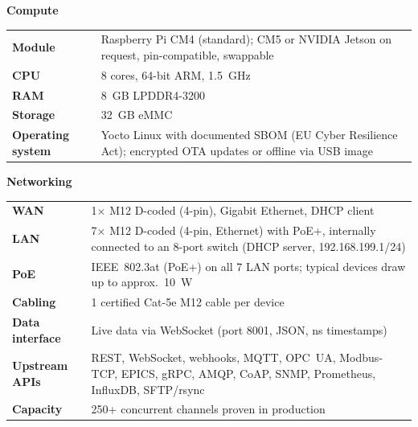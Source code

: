 \documentclass[10pt,a4paper]{article}
\begin{document}
\vspace{2mm}
\begin{minipage}[t]{0.48\textwidth}
\textbf{Compute}\par\vspace{1mm}
\begin{tabularx}{\textwidth}{@{}>{\bfseries}p{2.9cm}X@{}}
\toprule
Module & Raspberry Pi CM4 (standard); CM5 or NVIDIA Jetson on request, pin-compatible, swappable \\
CPU & 8 cores, 64-bit ARM, \SI{1.5}{GHz} \\
RAM & \SI{8}{GB} LPDDR4-3200 \\
Storage & \SI{32}{GB} eMMC \\
Operating system & Yocto Linux with documented SBOM (EU Cyber Resilience Act); encrypted OTA updates or offline via USB image \\
\bottomrule
\end{tabularx}

\vspace{2mm}
\textbf{Networking}\par\vspace{1mm}
\begin{tabularx}{\textwidth}{@{}>{\bfseries}p{2.9cm}X@{}}
\toprule
WAN & 1$\times$ M12 D-coded (4-pin), Gigabit Ethernet, DHCP client \\
LAN & 7$\times$ M12 D-coded (4-pin, Ethernet) with PoE+, internally connected to an 8-port switch (DHCP server, 192.168.199.1/24) \\
PoE & IEEE~802.3at (PoE+) on all 7 LAN ports; typical devices draw up to approx.\ \SI{10}{W} \\
Cabling & 1 certified Cat-5e M12 cable per device \\
Data interface & Live data via WebSocket (port 8001, JSON, ns timestamps) \\
Upstream APIs & REST, WebSocket, webhooks, MQTT, OPC~UA, Modbus-TCP, EPICS, gRPC, AMQP, CoAP, SNMP, Prometheus, InfluxDB, SFTP/rsync \\
Capacity & 250+ concurrent channels proven in production \\
\bottomrule
\end{tabularx}
\end{minipage}\hfill
\end{document}

